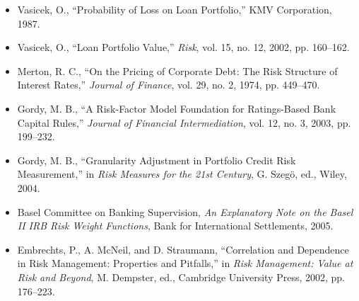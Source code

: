\documentclass[11pt]{article}
\theoremstyle{remark}
\theoremstyle{definition}
\begin{document}
\begin{itemize}
    \item Vasicek, O., ``Probability of Loss on Loan Portfolio,'' KMV Corporation, 1987.
    \item Vasicek, O., ``Loan Portfolio Value,'' \emph{Risk}, vol. 15, no. 12, 2002, pp. 160--162.
    \item Merton, R. C., ``On the Pricing of Corporate Debt: The Risk Structure of Interest Rates,'' \emph{Journal of Finance}, vol. 29, no. 2, 1974, pp. 449--470.
    \item Gordy, M. B., ``A Risk-Factor Model Foundation for Ratings-Based Bank Capital Rules,'' \emph{Journal of Financial Intermediation}, vol. 12, no. 3, 2003, pp. 199--232.
    \item Gordy, M. B., ``Granularity Adjustment in Portfolio Credit Risk Measurement,'' in \emph{Risk Measures for the 21st Century}, G. Szeg\"o, ed., Wiley, 2004.
    \item Basel Committee on Banking Supervision, \emph{An Explanatory Note on the Basel II IRB Risk Weight Functions}, Bank for International Settlements, 2005.
    \item Embrechts, P., A. McNeil, and D. Straumann, ``Correlation and Dependence in Risk Management: Properties and Pitfalls,'' in \emph{Risk Management: Value at Risk and Beyond}, M. Dempster, ed., Cambridge University Press, 2002, pp. 176--223.
\end{itemize}
\end{document}

